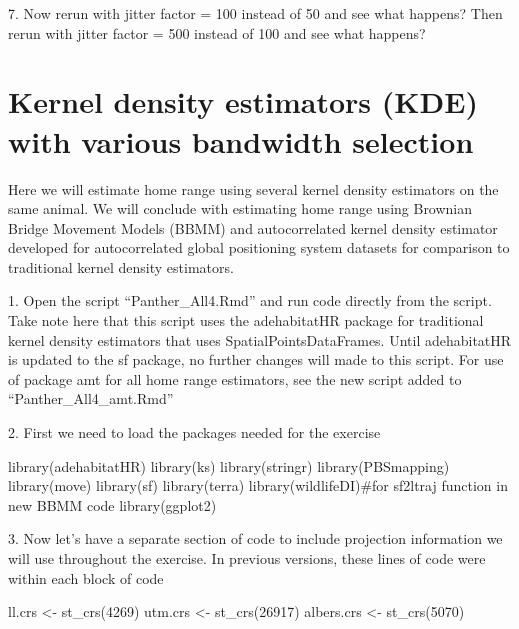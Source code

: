 \documentclass[
  letterpaper,
]{book}
\newenvironment{Shaded}{\begin{snugshade}}{\end{snugshade}}
\newcommand{\CommentTok}[1]{\textcolor[rgb]{0.37,0.37,0.37}{#1}}
\newcommand{\DecValTok}[1]{\textcolor[rgb]{0.68,0.00,0.00}{#1}}
\newcommand{\FunctionTok}[1]{\textcolor[rgb]{0.28,0.35,0.67}{#1}}
\newcommand{\NormalTok}[1]{\textcolor[rgb]{0.00,0.23,0.31}{#1}}
\newcommand{\OtherTok}[1]{\textcolor[rgb]{0.00,0.23,0.31}{#1}}
\begin{document}
7. Now rerun with jitter factor = 100 instead of 50 and see what
happens? Then rerun with jitter factor = 500 instead of 100 and see what
happens?

\hypertarget{kernel-density-estimators-kde-with-various-bandwidth-selection}{%
\chapter{Kernel density estimators (KDE) with various bandwidth
selection}\label{kernel-density-estimators-kde-with-various-bandwidth-selection}}

Here we will estimate home range using several kernel density estimators
on the same animal. We will conclude with estimating home range using
Brownian Bridge Movement Models (BBMM) and autocorrelated kernel density
estimator developed for autocorrelated global positioning system
datasets for comparison to traditional kernel density estimators.

1. Open the script ``Panther\_All4.Rmd'' and run code directly from the
script. Take note here that this script uses the adehabitatHR package
for traditional kernel density estimators that uses
SpatialPointsDataFrames. Until adehabitatHR is updated to the sf
package, no further changes will made to this script. For use of package
amt for all home range estimators, see the new script added to
``Panther\_All4\_amt.Rmd''

2. First we need to load the packages needed for the exercise

\begin{Shaded}
\begin{Highlighting}[]
\FunctionTok{library}\NormalTok{(adehabitatHR)}
\FunctionTok{library}\NormalTok{(ks)}
\FunctionTok{library}\NormalTok{(stringr)}
\FunctionTok{library}\NormalTok{(PBSmapping)}
\FunctionTok{library}\NormalTok{(move)}
\FunctionTok{library}\NormalTok{(sf)}
\FunctionTok{library}\NormalTok{(terra)}
\FunctionTok{library}\NormalTok{(wildlifeDI)}\CommentTok{\#for sf2ltraj function in new BBMM code}
\FunctionTok{library}\NormalTok{(ggplot2)}
\end{Highlighting}
\end{Shaded}

3. Now let's have a separate section of code to include projection
information we will use throughout the exercise. In previous versions,
these lines of code were within each block of code

\begin{Shaded}
\begin{Highlighting}[]
\NormalTok{ll.crs }\OtherTok{\textless{}{-}} \FunctionTok{st\_crs}\NormalTok{(}\DecValTok{4269}\NormalTok{)}
\NormalTok{utm.crs }\OtherTok{\textless{}{-}} \FunctionTok{st\_crs}\NormalTok{(}\DecValTok{26917}\NormalTok{)}
\NormalTok{albers.crs }\OtherTok{\textless{}{-}} \FunctionTok{st\_crs}\NormalTok{(}\DecValTok{5070}\NormalTok{)}
\end{Highlighting}
\end{Shaded}
\end{document}
